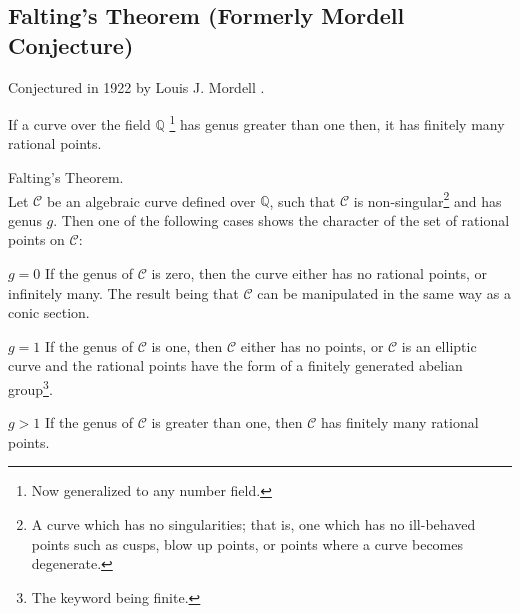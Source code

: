 \subsection*{Falting's Theorem (Formerly Mordell Conjecture)}

Conjectured in 1922 by Louis J. Mordell \cite{Mor1922}.

\medskip 

\begin{con} 
If a curve over the field $\mathbb{Q}$ \footnote{Now generalized to any number field.} has genus greater than one then, it has finitely many rational points.
\end{con}

\bigskip

\begin{thm}{Falting's Theorem.} \\
Let $\mathcal{C}$ be an algebraic curve defined over $\mathbb{Q}$, such that $\mathcal{C}$ is non-singular\footnote{A curve which has no singularities; that is, one which has no ill-behaved points such as cusps, blow up points, or points where a curve becomes degenerate.} and has genus $g$. Then one of the following cases shows the 
character of the set of rational points on $\mathcal{C}$: 
\end{thm}

\begin{case}{$g = 0$}
If the genus of $\mathcal{C}$ is zero, then the curve either has no rational points, or infinitely many. The result being that $\mathcal{C}$ can be manipulated in the same way as a conic section.
\end{case}

\smallskip

\begin{case}{$g=1$}
If the genus of $\mathcal{C}$ is one, then $\mathcal{C}$ either has no points, or $\mathcal{C}$ is an elliptic curve and the rational points have the form of a finitely generated abelian group\footnote{The keyword being finite.}.
\end{case}

\smallskip

\begin{case}{$g > 1$}
If the genus of $\mathcal{C}$ is greater than one, then $\mathcal{C}$ has finitely many rational points. 
\end{case}
\cite{Fal1983}
\bigskip 